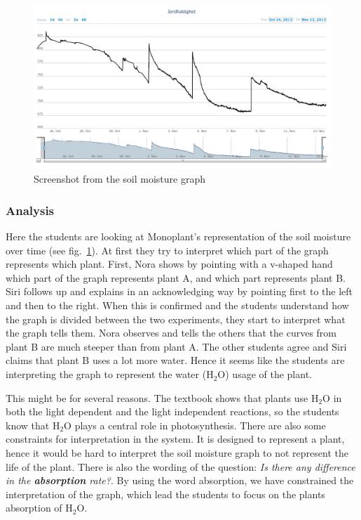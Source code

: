 \begin{figure}
	\centering
	\includegraphics[width=1.0\textwidth]{img/dataandanalasys/soilmoisturegraph.png}
	\caption{Screenshot from the soil moisture graph}
	\label{fig:soilmoistscreenshot}
\end{figure}

\subsubsection*{Analysis}
Here the students are looking at Monoplant's representation of the soil moisture over time (see fig.~\ref{fig:soilmoistscreenshot}). At first they try to interpret which part of the graph represents which plant. First, Nora shows by pointing with a v-shaped hand which part of the graph represents plant A, and which part represents plant B. Siri follows up and explains in an acknowledging way by pointing first to the left and then to the right. When this is confirmed and the students understand how the graph is divided between the two experiments, they start to interpret what the graph tells them. Nora observes and tells the others that the curves from plant B are much steeper than from plant A. The other students agree and Siri claims that plant B uses a lot more water. Hence it seems like the students are interpreting the graph to represent the water ($\text{H}_2\text{O}$) usage of the plant. 

This might be for several reasons. The textbook shows that plants use $\text{H}_2\text{O}$ in both the light dependent and the light independent reactions, so the students know that $\text{H}_2\text{O}$ plays a central role in photosynthesis. There are also some constraints for interpretation in the system. It is designed to represent a plant, hence it would be hard to interpret the soil moisture graph to not represent the life of the plant. There is also the wording of the question: \emph{Is there any difference in the \textbf{absorption} rate?}. By using the word absorption, we have constrained the interpretation of the graph, which lead the students to focus on the plants absorption of $\text{H}_2\text{O}$.
